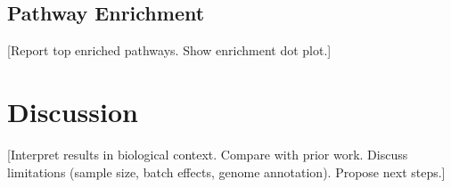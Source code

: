 \documentclass[11pt,a4paper]{article}
\begin{document}

\subsection{Pathway Enrichment}

[Report top enriched pathways. Show enrichment dot plot.]


\section{Discussion}

[Interpret results in biological context. Compare with prior work.
Discuss limitations (sample size, batch effects, genome annotation).
Propose next steps.]



\end{document}
